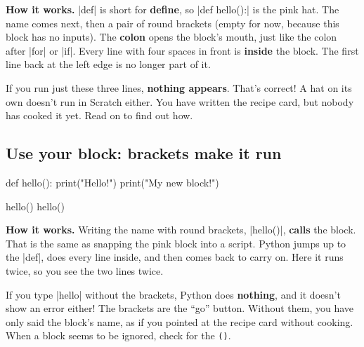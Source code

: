 \textbf{How it works.} \py|def| is short for \textbf{define}, so \py|def hello():| is the pink  hat. The name comes next, then a pair of round brackets (empty for now, because this block has no inputs). The \textbf{colon} opens the block's mouth, just like the colon after \py|for| or \py|if|. Every line with four spaces in front is \textbf{inside} the block. The first line back at the left edge is no longer part of it.

\begin{think}
If you run just these three lines, \textbf{nothing appears}. That's correct! A  hat on its own doesn't run in Scratch either. You have written the recipe card, but nobody has cooked it yet. Read on to find out how.
\end{think}

\subsection*{Use your block: brackets make it run}

\begin{tcbraster}[raster columns=2, raster equal height=rows, raster column skip=12pt, raster valign=center, raster force size=false, raster column 1/.style={add to width=-2cm}, raster column 2/.style={add to width=2cm}]
\begin{tcolorbox}[colback=white, colframe=white, boxrule=0pt, valign=center]
\begin{scratch}
\end{scratch}
\end{tcolorbox}
\begin{code}
def hello():
    print("Hello!")
    print("My new block!")

hello()
hello()
\end{code}
\end{tcbraster}

\textbf{How it works.} Writing the name with round brackets, \py|hello()|, \textbf{calls} the block. That is the same as snapping the pink  block into a script. Python jumps up to the \py|def|, does every line inside, and then comes back to carry on. Here it runs twice, so you see the two lines twice.

\begin{watchout}
If you type \py|hello| without the brackets, Python does \textbf{nothing}, and it doesn't show an error either! The brackets are the ``go'' button. Without them, you have only said the block's name, as if you pointed at the recipe card without cooking. When a block seems to be ignored, check for the \texttt{()}.
\end{watchout}

